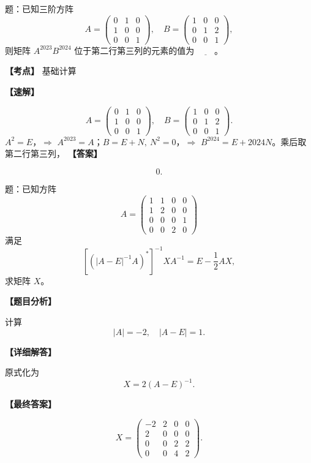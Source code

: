 ﻿\documentclass[11pt,a4paper,UTF8]{ctexart}
\begin{document}
\begin{answerbox}[2022--2023 填空 3]
题：已知三阶方阵
\[
A=\begin{pmatrix}0&1&0\\1&0&0\\0&0&1\end{pmatrix},\quad
B=\begin{pmatrix}1&0&0\\0&1&2\\0&0&1\end{pmatrix},
\]
则矩阵 $A^{2023}B^{2024}$ 位于第二行第三列的元素的值为 $\underline{\qquad}$。

\textbf{【考点】} 基础计算

\textbf{【速解】}


\[
A=\begin{pmatrix}0&1&0\\1&0&0\\0&0&1\end{pmatrix},\quad
B=\begin{pmatrix}1&0&0\\0&1&2\\0&0&1\end{pmatrix}.
\]
$A^2=E$，$\Rightarrow$ $A^{2023}=A$；$B=E+N,\ N^2=0$，$\Rightarrow$ $B^{2024}=E+2024N$。乘后取第二行第三列，
\textbf{【答案】}

\[0.\]
\end{answerbox}
\begin{answerbox}
题：已知方阵
\[
A=\begin{pmatrix}
1&1&0&0\\
1&2&0&0\\
0&0&0&1\\
0&0&2&0
\end{pmatrix}
\]
满足
\[
\left[(|A-E|^{-1}A)^*\right]^{-1}XA^{-1}=E-\frac12AX,
\]
求矩阵 $X$。

\textbf{【题目分析】}

计算
\[|A|=-2,\quad |A-E|=1.\]

\textbf{【详细解答】}

原式化为
\[X=2(A-E)^{-1}.\]

\textbf{【最终答案】}


\[
X=
\begin{pmatrix}
-2&2&0&0\\
2&0&0&0\\
0&0&2&2\\
0&0&4&2
\end{pmatrix}.
\]
\end{answerbox}
\end{document}
